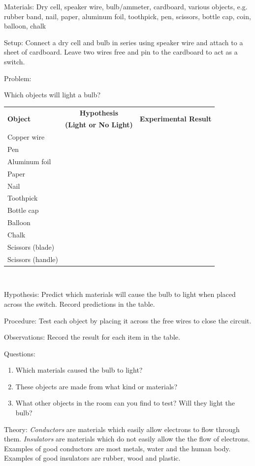 \begin{description*}
\item[Materials:]{Dry cell, speaker wire, bulb/ammeter, cardboard, various objects, e.g. rubber band, nail, paper, aluminum foil, toothpick, pen, scissors, bottle cap, coin, balloon, chalk}
\item[Setup:]{Connect a dry cell and bulb in series using speaker wire and attach to a sheet of cardboard. Leave two wires free and pin to the cardboard to act as a switch.}
\item[Problem:]{Which objects will light a bulb?\\

\begin{tabular}{|l|c|c|} \hline
\multirow{2}{*}{\textbf{Object}} & \textbf{Hypothesis} & \multirow{2}{*}{\textbf{Experimental Result}} \\
& \textbf{(Light or No Light)} & \\ \hline
Copper wire & & \\ \hline
Pen & & \\ \hline
Aluminum foil& & \\ \hline
Paper& & \\ \hline
Nail& & \\ \hline
Toothpick& & \\ \hline
Bottle cap& & \\ \hline
Balloon& & \\ \hline
Chalk& & \\ \hline
Scissors (blade)& & \\ \hline
Scissors (handle)& & \\ \hline
\end{tabular}\\[10pt]
}
\item[Hypothesis:]{Predict which materials will cause the bulb to light when placed across the switch. Record predictions in the table.}
\item[Procedure:]{Test each object by placing it across the free wires to close the circuit.}
\item[Observations:]{Record the result for each item in the table.}
\item[Questions:]{}\hfill 
\begin{enumerate}
\item Which materials caused the bulb to light?
\item These objects are made from what kind or materials?
\item What other objects in the room can you find to test? Will they light the bulb?
\end{enumerate}
\item[Theory:]{\emph{Conductors} are materials which easily allow electrons to flow through them. \emph{Insulators} are materials which do not easily allow the the flow of electrons. Examples of good conductors are most metals, water and the human body. Examples of good insulators are rubber, wood and plastic.}
\end{description*}

